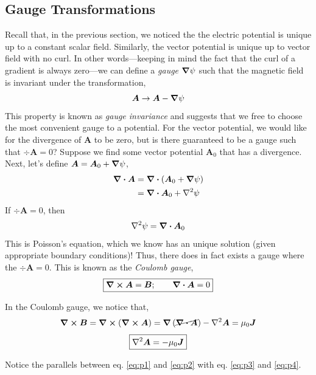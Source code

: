 \documentclass[12pt]{report}
\numberwithin{equation}{section}
\def\B{{\mbox{$\boldsymbol{B}$}}}
\renewcommand{\b}[1]{\boldsymbol{#1}}
\begin{document}
	\subsection{Gauge Transformations}
	Recall that, in the previous section, we noticed the the electric potential is unique up to a constant scalar field. Similarly, the vector potential is unique up to vector field with no curl. In other words---keeping in mind the fact that the curl of a gradient is always zero---we can define a \textit{gauge} $ \grad \psi $ such that the magnetic field is invariant under the transformation,
	\begin{equation}
		\b{A} \to \b{A} - \grad\psi
	\end{equation}
	This property is known as \textit{gauge invariance} and suggests that we free to choose the most convenient gauge to a potential. For the vector potential, we would like for the divergence of $ \b{A} $ to be zero, but is there guaranteed to be a gauge such that $ \div\b{A} =0$? Suppose we find some vector potential $ \b{A}_0 $ that has a divergence. Next, let's define $ \b{A} =  \b{A}_0 + \grad\psi$,
	\begin{align}
		\div\b{A}  &= \div \left(\b{A}_0  + \grad\psi\right)\\
		&= \div \b{A}_0  + \laplacian{\psi}
	\end{align}
	If $ \div\b{A} =0 $, then
	\begin{equation}
		 \laplacian{\psi} = \div \b{A}_0
	\end{equation}
	This is Poisson's equation, which we know has an unique solution (given appropriate boundary conditions)! Thus, there does in fact exists a gauge where the $ \div \b{A} =0 $. This is known as the \textit{Coulomb gauge},
	\begin{equation}
		\boxed{\curl\b{A} = \B;\qquad\div\b{A}=0}
	\end{equation}

	In the Coulomb gauge, we notice that,
	\begin{equation}
		\curl\B = \curl \left(\curl\b{A}\right) = \grad \left(\cancel{\div \b{A}}\right) - \laplacian{\b{A}} = \mu_0\b{J}
	\end{equation}
	\begin{equation}
		\boxed{\laplacian{\b{A}} = -\mu_0\b{J}}
		\label{eq:p4}
	\end{equation}
	
	Notice the parallels between eq. \ref{eq:p1} and \ref{eq:p2} with eq. \ref{eq:p3} and \ref{eq:p4}.
	
\end{document}
